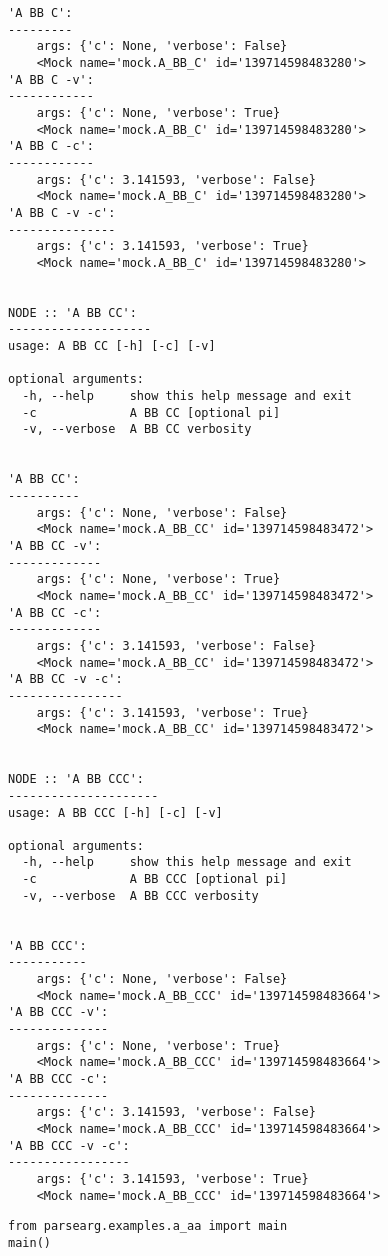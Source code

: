 \documentclass[10pt]{amsart}
\numberwithin{equation}{section}
\begin{document}
\begin{verbatim}
'A BB C':
---------
	args: {'c': None, 'verbose': False}
	<Mock name='mock.A_BB_C' id='139714598483280'>
'A BB C -v':
------------
	args: {'c': None, 'verbose': True}
	<Mock name='mock.A_BB_C' id='139714598483280'>
'A BB C -c':
------------
	args: {'c': 3.141593, 'verbose': False}
	<Mock name='mock.A_BB_C' id='139714598483280'>
'A BB C -v -c':
---------------
	args: {'c': 3.141593, 'verbose': True}
	<Mock name='mock.A_BB_C' id='139714598483280'>


NODE :: 'A BB CC':
--------------------
usage: A BB CC [-h] [-c] [-v]

optional arguments:
  -h, --help     show this help message and exit
  -c             A BB CC [optional pi]
  -v, --verbose  A BB CC verbosity


'A BB CC':
----------
	args: {'c': None, 'verbose': False}
	<Mock name='mock.A_BB_CC' id='139714598483472'>
'A BB CC -v':
-------------
	args: {'c': None, 'verbose': True}
	<Mock name='mock.A_BB_CC' id='139714598483472'>
'A BB CC -c':
-------------
	args: {'c': 3.141593, 'verbose': False}
	<Mock name='mock.A_BB_CC' id='139714598483472'>
'A BB CC -v -c':
----------------
	args: {'c': 3.141593, 'verbose': True}
	<Mock name='mock.A_BB_CC' id='139714598483472'>


NODE :: 'A BB CCC':
---------------------
usage: A BB CCC [-h] [-c] [-v]

optional arguments:
  -h, --help     show this help message and exit
  -c             A BB CCC [optional pi]
  -v, --verbose  A BB CCC verbosity


'A BB CCC':
-----------
	args: {'c': None, 'verbose': False}
	<Mock name='mock.A_BB_CCC' id='139714598483664'>
'A BB CCC -v':
--------------
	args: {'c': None, 'verbose': True}
	<Mock name='mock.A_BB_CCC' id='139714598483664'>
'A BB CCC -c':
--------------
	args: {'c': 3.141593, 'verbose': False}
	<Mock name='mock.A_BB_CCC' id='139714598483664'>
'A BB CCC -v -c':
-----------------
	args: {'c': 3.141593, 'verbose': True}
	<Mock name='mock.A_BB_CCC' id='139714598483664'>
\end{verbatim}

\begin{verbatim}
from parsearg.examples.a_aa import main
main()
\end{verbatim}
\end{document}
